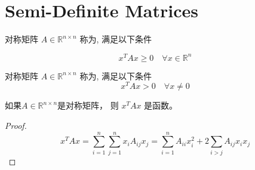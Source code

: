 \section{Semi-Definite Matrices}

\begin{definition}[半正定矩阵]
    对称矩阵 $ A \in \mathbb{R}^{n \times n} $ 称为, 满足以下条件

\begin{equation}
x^{T} A x \geq 0 \quad \forall x \in \mathbb{R}^{n}
\end{equation}
\end{definition}

\begin{definition}[正定矩阵]
    对称矩阵 $ A \in \mathbb{R}^{n \times n} $ 称为, 满足以下条件
\begin{equation}
x^{T} A x>0 \quad \forall x \neq 0
\end{equation}
\end{definition}

\begin{definition}[二次型]
    如果$ A \in \mathbb{R}^{n \times n} $是对称矩阵， 则 $ x^{T} A x $ 是函数。
\end{definition}

\begin{proof}
    \begin{equation} x^{T} A x=\sum_{i=1}^{n} \sum_{j=1}^{n} x_{i} A_{i j} x_{j}=\sum_{i=1}^{n} A_{i i} x_{i}^{2}+2 \sum_{i>j} A_{i j} x_{i} x_{j} \end{equation}
\end{proof}

